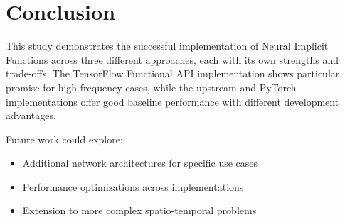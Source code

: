 \documentclass[10pt,journal,compsoc,onecolumn]{IEEEtran}
\begin{document}
\section{Conclusion}
This study demonstrates the successful implementation of Neural Implicit Functions across three different approaches, each with its own strengths and trade-offs. The TensorFlow Functional API implementation shows particular promise for high-frequency cases, while the upstream and PyTorch implementations offer good baseline performance with different development advantages.

Future work could explore:
\begin{itemize}
    \item Additional network architectures for specific use cases
    \item Performance optimizations across implementations
    \item Extension to more complex spatio-temporal problems
\end{itemize}



\end{document}
